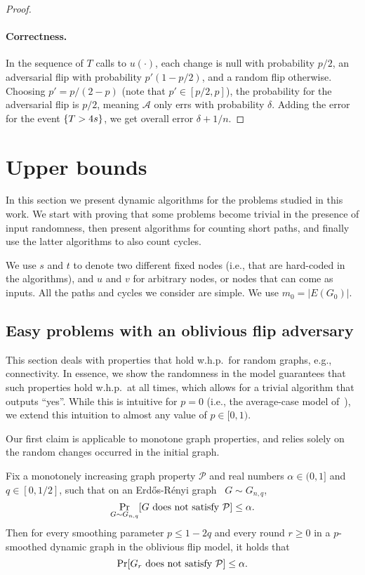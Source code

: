 \documentclass[letter,11pt]{article}
\newcommand{\er}{Erd\H{o}s-R\'{e}nyi\xspace}
\newcommand{\alg}[1]{{\mathcal{#1}}}
\begin{document}
\begin{proof}
    \paragraph{Correctness.} In the sequence of $T$ calls to $u(\cdot)$, each change is null with probability $p/2$, an adversarial flip with probability $p' (1-p/2)$, and a random flip otherwise.
    Choosing $p' = p/(2-p)$ (note that $p' \in [p/2,p]$), the probability for the adversarial flip is $p/2$, meaning $\alg{A}$ only errs with probability $\delta$. Adding the error for the event $\{T > 4s\}$, we get overall error $\delta + 1/n$.
\end{proof}

\section{Upper bounds}
\label{sec:upper}
In this section we present dynamic algorithms for the problems studied in this work. 
We start with proving that some problems become trivial in the presence of input randomness, 
then present algorithms for counting short paths, 
and finally use the latter algorithms to also count cycles.

We use $s$ and $t$ to denote two different fixed nodes (i.e., that are hard-coded in the algorithms), and $u$ and $v$ for arbitrary nodes, or nodes that can come as inputs.
All the paths and cycles we consider are simple. We use $m_0=|E(G_0)|$.

\subsection{Easy problems with an oblivious flip adversary}
\label{sec:upper-easy-with-flip}
This section deals with  properties that hold w.h.p.\ for random graphs, e.g., connectivity.
In essence, we show the randomness in the model guarantees that such properties hold w.h.p.\ at all times, which allows for a trivial algorithm that outputs ``yes''. 
While this is intuitive for $p=0$ (i.e., the average-case model of~\cite{HLS22}), we extend this intuition to almost any value of $p\in[0,1)$.  

Our first claim is applicable to monotone graph properties, and relies solely on the random changes occurred in the initial graph.

\begin{claim}
    \label{claim:oblivious_flip_contains_G_np}
    Fix a monotonely increasing graph property $\mathcal{P}$ and real numbers $\alpha \in(0,1]$ and $q \in [0,1/2]$, such that on an \er graph ~$G \sim G_{n,q}$,
    \[
        \Prob{G \sim G_{n,q}}{G \textnormal{ does not satisfy } \mathcal{P}} \leq \alpha .
    \]
    Then for every smoothing parameter $p \leq 1-2q$ and every round $r \geq 0$ in a $p$-smoothed dynamic graph in the oblivious flip model, it holds that
    \[
        \Prob{}{G_r \textnormal{ does not satisfy }\mathcal{P}} \leq \alpha .
    \]
    
\end{claim}
\end{document}
